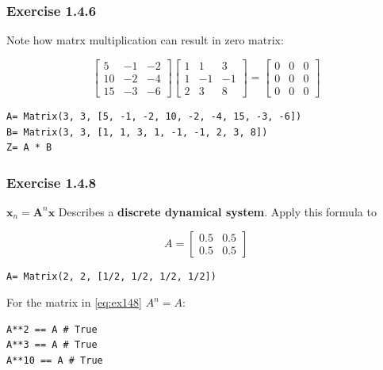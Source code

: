 \subsubsection{Exercise 1.4.6}

Note how matrx multiplication can result in zero matrix:

\begin{equation}
\left[\begin{matrix}5 & -1 & -2\\10 & -2 & -4\\15 & -3 & -6\end{matrix}\right]
\left[\begin{matrix}1 & 1 & 3\\1 & -1 & -1\\2 & 3 & 8\end{matrix}\right]
= \left[\begin{matrix}0 & 0 & 0\\0 & 0 & 0\\0 & 0 & 0\end{matrix}\right]
\end{equation}

\begin{verbatim}
A= Matrix(3, 3, [5, -1, -2, 10, -2, -4, 15, -3, -6])
B= Matrix(3, 3, [1, 1, 3, 1, -1, -1, 2, 3, 8])
Z= A * B
\end{verbatim}

\subsubsection{Exercise 1.4.8}

$\mathbf{x}_n = \mathbf{A}^n\mathbf{x}$ Describes a \textbf{discrete dynamical
system}. Apply this formula to

\begin{equation}\label{eq:ex148}
A = \left[\begin{matrix}0.5 & 0.5\\0.5 & 0.5\end{matrix}\right]
\end{equation}

\begin{verbatim}
A= Matrix(2, 2, [1/2, 1/2, 1/2, 1/2])
\end{verbatim}

For the matrix in \ref{eq:ex148} $A^n = A$:

\begin{verbatim}
A**2 == A # True
A**3 == A # True
A**10 == A # True
\end{verbatim}


